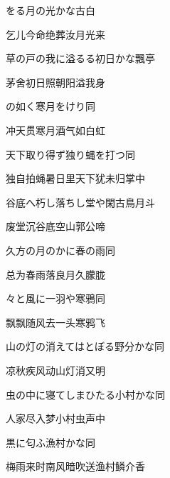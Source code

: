 \begin{haiku}
    {\FH {}をる月の光かな}\hfill{\FH 古白}

    {\FK 乞儿今命绝葬汝月光来}
\end{haiku}

\begin{haiku}
    {\FH 草の戸の我に溢るる初日かな}\hfill{\FH 飄亭}

    {\FK 茅舍初日照朝阳溢我身}
\end{haiku}

\begin{haiku}
    {\FH {}の如く寒月をけり}\hfill{\FH 同}

    {\FK 冲天贯寒月酒气如白虹}
\end{haiku}

\begin{haiku}
    {\FH 天下取り得ず独り蝿を打つ}\hfill{\FH 同}

    {\FK 独自拍蝇暑日里天下犹未归掌中}
\end{haiku}

\begin{haiku}
    {\FH 谷底へ朽し落ちし堂や閑古鳥}\hfill{\FH 月斗}

    {\FK 废堂沉谷底空山郭公啼}
\end{haiku}

\begin{haiku}
    {\FH 久方の月のかに春の雨}\hfill{\FH 同}

    {\FK 总为春雨落良月久朦胧}
\end{haiku}

\begin{haiku}
    {\FH {}々と風に一羽や寒鴉}\hfill{\FH 同}

    {\FK 飘飘随风去一头寒鸦飞}
\end{haiku}

\begin{haiku}
    {\FH 山の灯の消えてはとぼる野分かな}\hfill{\FH 同}

    {\FK 凉秋疾风动山灯消又明}
\end{haiku}

\begin{haiku}
    {\FH 虫の中に寝てしまひたる小村かな}\hfill{\FH 同}

    {\FK 人家尽入梦小村虫声中}
\end{haiku}

\begin{haiku}
    {\FH 黒に匂ふ漁村かな}\hfill{\FH 同}

    {\FK 梅雨来时南风暗吹送渔村鳞介香}
\end{haiku}

